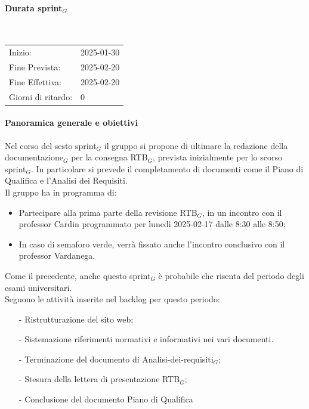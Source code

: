 \documentclass[10pt]{article}
\begin{document}
{{{{{{    \paragraph{Durata sprint$_G$}\mbox{}\\
    \vspace{-1.5em}
    \begin{table}[h] 
    \renewcommand{\arraystretch}{1.2}  
    \begin{tabular}{ l l }
        Inizio: & 2025-01-30 \\
        Fine Prevista: & 2025-02-20 \\
        Fine Effettiva: & 2025-02-20 \\
        Giorni di ritardo: & 0 \\
    \end{tabular}
    \end{table}
    \vspace{-2em}
    {\renewcommand{\arraystretch}{1.5}%
    
    \paragraph{Panoramica generale e obiettivi}\mbox{}\vspace{0.4em}

    Nel corso del sesto sprint$_G$ il gruppo si propone di ultimare la redazione della documentazione$_G$ per la consegna RTB$_G$, prevista inizialmente per lo scorso sprint$_G$.
    In particolare si prevede il completamento di documenti come il Piano di Qualifica e l'Analisi dei Requisiti.
    \\
    Il gruppo ha in programma di:
    \begin{itemize}
        \item Partecipare alla prima parte della revisione RTB$_G$, in un incontro con il professor Cardin programmato per lunedì 2025-02-17 dalle 8:30 alle 8:50;
        \item In caso di semaforo verde, verrà fissato anche l'incontro conclusivo con il professor Vardanega.
    \end{itemize}
    Come il precedente, anche questo sprint$_G$ è probabile che risenta del periodo degli esami universitari.\\

    Seguono le attività inserite nel backlog per questo periodo:
    \vspace{-0.5em}
    \begin{itemize}
    \setlength\itemsep{-0.2em}
    \item [-] Ristrutturazione del sito web;
    \item [-] Sistemazione riferimenti normativi e informativi nei vari documenti.
    \item [-] Terminazione del documento di Analisi-dei-requisiti$_G$;
    \item [-] Stesura della lettera di presentazione RTB$_G$;
\item [-] Conclusione del documento Piano di Qualifica


\end{itemize}}}}}}}}
\end{document}
